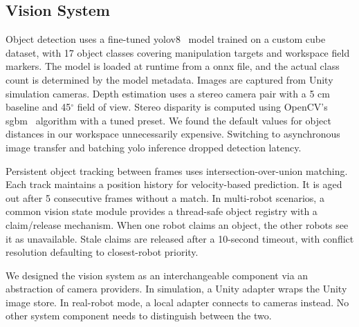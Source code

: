 \documentclass[
     12pt,
     a4paper,
     BCOR=10mm,
     DIV=14,
     listof=totoc,
     bibliography=totoc,
     parskip,
     twoside,
     headsepline
     ]{scrreprt}
\begin{document}
\subsection{Vision System}
Object detection uses a fine-tuned \gls{yolo}v8~\cite{yolov8_ultralytics} model trained on a custom cube dataset, with 17 object classes covering manipulation targets and workspace field markers. The model is loaded at runtime from a \gls{onnx} file, and the actual class count is determined by the model metadata. Images are captured from Unity simulation cameras. Depth estimation uses a stereo camera pair with a 5 cm baseline and 45$^\circ$ field of view. Stereo disparity is computed using OpenCV's \gls{sgbm}~\cite{4359315} algorithm with a tuned preset. We found the default values for object distances in our workspace unnecessarily expensive. Switching to asynchronous image transfer and batching \gls{yolo} inference dropped detection latency.

Persistent object tracking between frames uses intersection-over-union matching. Each track maintains a position history for velocity-based prediction. It is aged out after 5 consecutive frames without a match. In multi-robot scenarios, a common vision state module provides a thread-safe object registry with a claim/release mechanism. When one robot claims an object, the other robots see it as unavailable. Stale claims are released after a 10-second timeout, with conflict resolution defaulting to closest-robot priority.

We designed the vision system as an interchangeable component via an abstraction of camera providers. In simulation, a Unity adapter wraps the Unity image store. In real-robot mode, a local adapter connects to cameras instead. No other system component needs to distinguish between the two.
\end{document}
